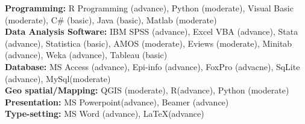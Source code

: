 

\begin{cvparagraph}
\textbf{Programming: } R Programming (advance), Python (moderate), Visual Basic (moderate), C\# (basic), Java (basic), Matlab (moderate)\\
\textbf{Data Analysis Software:} IBM SPSS (advance), Excel VBA (advance), Stata (advance), Statistica (basic), AMOS (moderate), Eviews (moderate), Minitab (advance), Weka (advance), Tableau (basic)\\ 
\textbf{Database:} MS Access (advance), Epi-info (advance), FoxPro (advacne), SqLite (advance), MySql(moderate)\\
\textbf{Geo spatial/Mapping:} QGIS (moderate), R(advance), Python (moderate)\\
\textbf{Presentation:} MS Powerpoint(advance), Beamer (advance)\\
\textbf{Type-setting:} MS Word (advance), \LaTeX (advance)

\end{cvparagraph}
